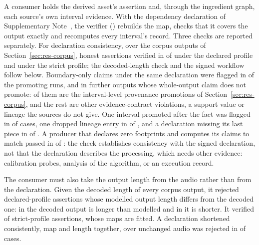 \documentclass[preprint,3p,11pt,authoryear]{elsarticle}
\begin{document}
A consumer holds the derived asset's assertion and, through the ingredient
graph, each source's own interval evidence. With the dependency declaration of
Supplementary Note~\NoteSchema{}, the verifier () rebuilds
the map, checks that it covers the output exactly and recomputes every
interval's record. Three checks are reported separately. For declaration
consistency, over the \Pout{} corpus outputs of Section~\ref{sec:res-corpus}, honest assertions
verified in \PhonestDecl{} of \Pout{} under the declared profile and
\PhonestStrict{} under the strict profile; the decoded-length check and the
signed workflow follow below. Boundary-only claims under the same
declaration were flagged in \PbaseFlagged{} of the \PbasePromo{} promoting runs,
and in \PbaseLocal{} further outputs whose whole-output claim does not promote:
\DoverlayInterval{} of them are the interval-level provenance promotions of
Section~\ref{sec:res-corpus}, and the rest are other evidence-contract violations,
a support value or lineage the sources do not give. One interval promoted after the fact was
flagged in \PtamperFlagged{} of \PtamperCases{} cases, one dropped lineage entry
in \PlinFlagged{} of \PlinCases{}, and a declaration missing its last piece in
\PgapFlagged{} of \PgapCases{}. A producer that declares zero footprints and
computes its claims to match passed in \PnarrowPassed{} of \PnarrowCases{}: the
check establishes consistency with the signed declaration, not that the
declaration describes the processing, which needs other evidence: calibration
probes, analysis of the algorithm, or an execution record.

The consumer must also take the output length from the audio rather than from
the declaration. Given the decoded length of every corpus output, it
rejected \DdeclRejected{} declared-profile assertions whose modelled output length
differs from the decoded one: in \DfallbackOutputs{} the decoded output is longer
than modelled and in \DshorterOut{} it is shorter. It verified \DstrictVerified{} of \Druns{} strict-profile
assertions, whose maps are fitted. A declaration shortened consistently, map and
length together, over unchanged audio was rejected in \PshortFlagged{} of
\PshortCases{} cases.
\end{document}
